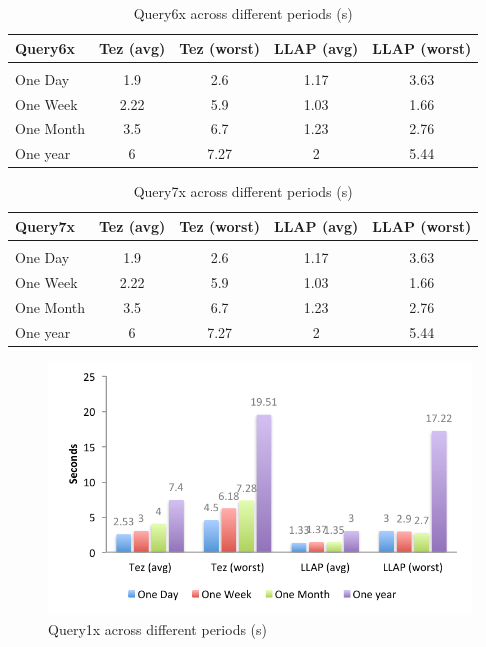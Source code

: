 \begin{table}[h]
\begin{tabular}{l|*{4}c}
Query6x  &   Tez (avg)  &   Tez (worst)  &   LLAP (avg)  &   LLAP (worst) \\
\hline \\
One Day  &   1.9  &   2.6  &   1.17  &   3.63 \\
One Week  &   2.22  &   5.9  &   1.03  &   1.66 \\
One Month  &   3.5  &   6.7  &   1.23  &   2.76 \\
One year  &   6  &   7.27  &   2  &   5.44 \\
\end{tabular}
\caption{Query6x across different periods (s)}
\end{table}

\begin{table}[h]
\begin{tabular}{l|*{4}c}
Query7x  &   Tez (avg)  &   Tez (worst)  &   LLAP (avg)  &   LLAP (worst) \\
\hline \\
One Day  &   1.9  &   2.6  &   1.17  &   3.63 \\
One Week  &   2.22  &   5.9  &   1.03  &   1.66 \\
One Month  &   3.5  &   6.7  &   1.23  &   2.76 \\
One year  &   6  &   7.27  &   2  &   5.44 \\
\end{tabular}
\caption{Query7x across different periods (s)}
\end{table}
\fi

\begin{figure}[bthp]
\centering
\includegraphics[width=0.9\columnwidth]{figures/q1x.pdf}
\caption{Query1x across different periods (s)}
\label{fig:q1x}
\end{figure} 

